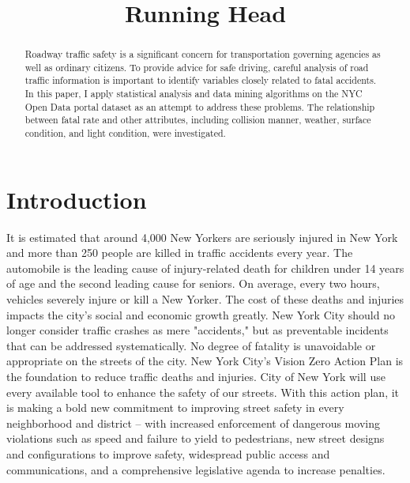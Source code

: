 \documentclass[conference]{IEEEtran}
\begin{document}
%
\title{Running Head}


\author{
}



\maketitle{}

\begin{abstract}
Roadway traffic safety is a significant concern for transportation governing agencies as well as ordinary citizens.  To provide advice for safe driving, careful analysis of road traffic information is important to identify variables closely related to fatal accidents.  In this paper, I apply statistical analysis and data mining algorithms on the NYC Open Data portal dataset as an attempt to address these problems. The relationship between fatal rate and other attributes, including collision manner, weather, surface condition, and light condition, were investigated.
\end{abstract}

\section{Introduction}
\label{sec:introduction}
It is estimated that around 4,000 New Yorkers are seriously injured in New York and more than 250 people are killed in traffic accidents every year. The automobile is the leading cause of injury-related death for children under 14 years of age and the second leading cause for seniors. On average, every two hours, vehicles severely injure or kill a New Yorker. The cost of these deaths and injuries impacts the city's social and economic growth greatly.  New York City should no longer consider traffic crashes as mere "accidents," but as preventable incidents that can be addressed systematically. No degree of fatality is unavoidable or appropriate on the streets of the city. New York City's Vision Zero Action Plan\cite{VisionZero} is the foundation to reduce traffic deaths and injuries. City of New York will use every available tool to enhance the safety of our streets. With this action plan, it is making a bold new commitment to improving street safety in every neighborhood and district – with increased enforcement of dangerous moving violations such as speed and failure to yield to pedestrians, new street designs and configurations to improve safety, widespread public access and communications, and a comprehensive legislative agenda to increase penalties. 
\end{document}
